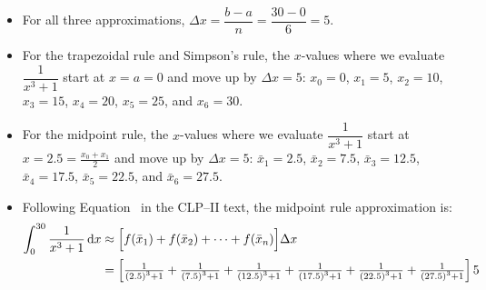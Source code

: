 \begin{solution}
\begin{itemize}
\item For all three approximations, $\Delta x = \dfrac{b-a}{n}=\dfrac{30-0}{6}=5$.


\item For the trapezoidal rule and Simpson's rule, the $x$-values where we evaluate $\dfrac{1}{x^3+1}$ start at $x=a=0$ and move up by $\Delta x = 5$:  $x_0=0$, $x_1=5$,
 $x_2=10$, $x_3=15$,
  $x_4=20$, $x_5=25$, and $x_6=30$.

  \begin{center}
  \end{center}

\item For the midpoint rule, the $x$-values where we evaluate $\dfrac{1}{x^3+1}$ start at $x=2.5 = \frac{x_0+x_1}{2}$ and move up by $\Delta x = 5$:  $\bar x_1=2.5$, $\bar x_2=7.5$,
 $\bar x_3=12.5$, $\bar x_4=17.5$,
  $\bar x_5=22.5$, and $\bar x_6=27.5$.


  \begin{center}
  \end{center}

\item  Following Equation~ in the CLP--II text,
the midpoint rule approximation is:
\begin{align*}
\int_0^{30} \frac{1}{x^3+1}\,\mathrm{d}x&\approx\Big[f(\bar x_1)+f(\bar x_2)+\cdots
+f(\bar x_n)\Big]\Delta x\\
&=\left[\tfrac{1}{\left(2.5\right)^3+1}
+\tfrac{1}{\left(7.5\right)^3+1}
+\tfrac{1}{\left(12.5\right)^3+1}
+\tfrac{1}{\left(17.5\right)^3+1}
+\tfrac{1}{\left(22.5\right)^3+1}
+\tfrac{1}{\left(27.5\right)^3+1}
\right]5
\end{align*}


\end{itemize}
\end{solution}
